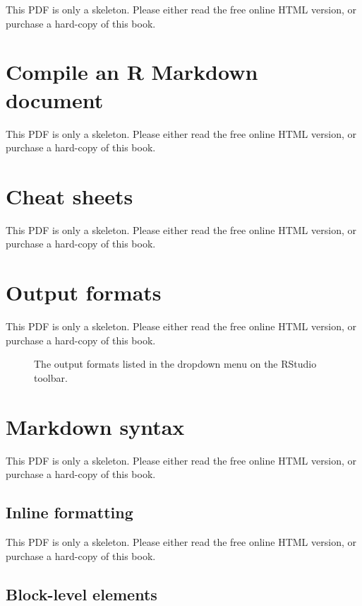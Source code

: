 \documentclass[
  11pt,
]{krantz}
\theoremstyle{definition}
\theoremstyle{definition}
\theoremstyle{definition}
\theoremstyle{definition}
\theoremstyle{remark}
\begin{document}
This PDF is only a skeleton. Please either read the free online HTML version, or purchase a hard-copy of this book.

\section{Compile an R Markdown document}\label{compile}

This PDF is only a skeleton. Please either read the free online HTML version, or purchase a hard-copy of this book.

\section{Cheat sheets}\label{cheat-sheets}

This PDF is only a skeleton. Please either read the free online HTML version, or purchase a hard-copy of this book.

\section{Output formats}\label{output-formats}

This PDF is only a skeleton. Please either read the free online HTML version, or purchase a hard-copy of this book.

\begin{figure}\caption{The output formats listed in the dropdown menu on the RStudio toolbar.}\end{figure}

\section{Markdown syntax}\label{markdown-syntax}

This PDF is only a skeleton. Please either read the free online HTML version, or purchase a hard-copy of this book.

\subsection{Inline formatting}\label{inline-formatting}

This PDF is only a skeleton. Please either read the free online HTML version, or purchase a hard-copy of this book.

\subsection{Block-level elements}\label{block-level-elements}
\end{document}
